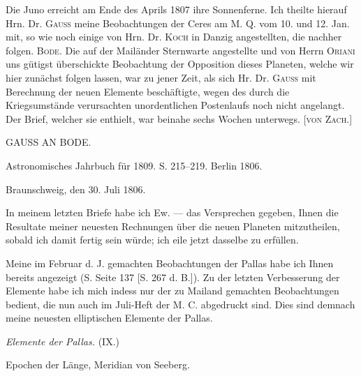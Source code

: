 \expandafter\def\csname HistoricalNoteText24\endcsname{Die Juno erreicht am Ende des Aprils 1807 ihre Sonnenferne.}
\expandafter\def\csname HistoricalNoteText25\endcsname{Ich theilte hierauf Hrn. Dr. \textsc{Gauss} meine Beobachtungen der Ceres am M. Q. vom 10. und 12. Jan. mit, so wie noch einige von Hrn. Dr. \textsc{Koch} in Danzig angestellten, die nachher folgen. \textsc{Bode.}}
\expandafter\def\csname HistoricalNoteText26\endcsname{Die auf der Mailänder Sternwarte angestellte und von Herrn \textsc{Oriani} uns gütigst überschickte Beobachtung der Opposition dieses Planeten, welche wir hier zunächst folgen lassen, war zu jener Zeit, als sich Hr. Dr. \textsc{Gauss} mit Berechnung der neuen Elemente beschäftigte, wegen des durch die Kriegsumstände verursachten unordentlichen Postenlaufs noch nicht angelangt. Der Brief, welcher sie enthielt, war beinahe sechs Wochen unterwegs. [\textsc{von Zach.}]}
\clearpage
{}
\hypertarget{native-283-lower}{}
\begin{center}
GAUSS AN BODE.
\end{center}

\begin{center}
Astronomisches Jahrbuch für 1809. S. 215–219. Berlin 1806.
\end{center}

\begin{flushright}
Braunschweig, den 30. Juli 1806.
\end{flushright}

\par\indent In meinem letzten Briefe habe ich Ew. --- das Versprechen gegeben, Ihnen die Resultate meiner
neuesten Rechnungen über die neuen Planeten mitzutheilen, sobald ich damit fertig sein würde; ich eile
jetzt dasselbe zu erfüllen.

\par\indent Meine im Februar d. J. gemachten Beobachtungen der Pallas habe ich Ihnen bereits angezeigt
(S. Seite 137 [S. 267 d. B.]). Zu der letzten Verbesserung der Elemente habe ich mich indess nur der zu
Mailand gemachten Beobachtungen bedient, die nun auch im Juli-Heft der M. C. abgedruckt sind. Dies
sind demnach meine neuesten elliptischen Elemente der Pallas.

\begin{center}
\emph{Elemente der Pallas.} (IX.)

Epochen der Länge, Meridian von Seeberg.
\end{center}

